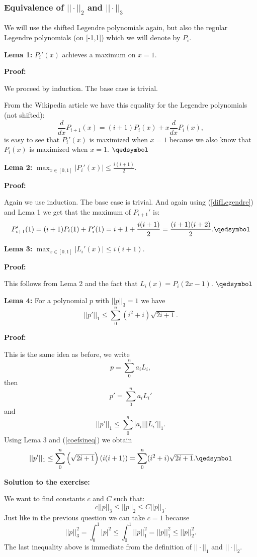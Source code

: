 \documentclass{article}
\begin{document}
\subsubsection*{Equivalence of $||\cdot||_2$ and $||\cdot||_3$}
We will use the shifted Legendre polynomials again, but also the regular
Legendre polynomials (on [-1,1]) which we will denote by $P_i$.

\textbf{Lema 1:} $P_i'(x)$ achieves a maximum on $x=1$.

\textbf{Proof:}

We proceed by induction. The base case is trivial.

From the Wikipedia article we have this equality for the Legendre polynomials
(not shifted):
\begin{equation}\label{difLegendre}
	\frac{d}{dx}P_{i+1}(x)= (i+1)P_i(x)+x\frac{d}{dx}P_i(x),
\end{equation}
is easy to see that $P_i'(x)$ is maximized when $x=1$ because we also know that
$P_i(x)$ is maximized when $x=1$. $\qedsymbol$

\textbf{Lema 2:} $\max_{x\in[0,1]}|P_i'(x)|\leq \frac{i(i+1)}{2}$.

\textbf{Proof:}

Again we use induction. The base case is trivial. And again using
(\ref{difLegendre}) and Lema 1 we get that the maximum of $P_{i+1}'$ is:
\[
	P_{i+1}'(1)=(i+1)P_i(1)+P_i'(1)=i+1+\frac{i(i+1)}{2}=\frac{(i+1)(i+2)}{2}.\qedsymbol
\]

\textbf{Lema 3:} $\max_{x\in[0,1]}|L_i'(x)|\leq i(i+1)$.

\textbf{Proof:}

This follows from Lema 2 and the fact that $L_i(x)=P_i(2x-1)$. $\qedsymbol$

\textbf{Lema 4:} For a polynomial $p$ with $||p||_3=1$ we have
\[
||p'||_1\leq \sum_0^n (i^2+i)\sqrt{2i+1}.
\]

\textbf{Proof:}

This is the same idea as before, we write
\[
	p=\sum_0^na_iL_i,
\]
then
\[
	p'=\sum_0^na_iL_i'
\]
and
\[
	||p'||_1 \leq \sum_0^n|a_i|||L_i'||_1.
\]
Using Lema 3 and (\ref{coefsineq}) we obtain
\[
	||p'||_1 \leq \sum_0^n\left(\sqrt{2i+1}\right)\left(i(i+1)\right)=\sum_0^n (i^2+i)\sqrt{2i+1}. \qedsymbol
\]

\textbf{Solution to the exercise:}

We want to find constants $c$ and $C$ such that:
\[
	c||p||_3\leq ||p||_2 \leq C||p||_3.
\]
Just like in the previous question we can take $c=1$ because
\[
||p||_3^2=\int_0^1|p|^2\leq \int_0^1||p||_1^2=||p||_1^2\leq ||p||_2^2.
\]
The last inequality above is immediate from the definition of $||\cdot||_1$ and $||\cdot||_2$.
\end{document}
